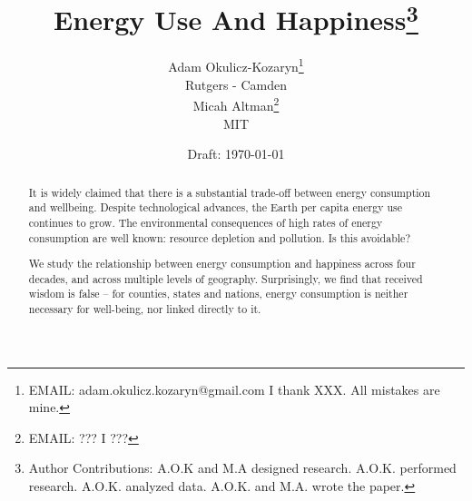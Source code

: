 \documentclass[10pt, letterpaper]{article}
\date{Draft: {}\today}
\title{
Energy Use And Happiness\footnote{Author Contributions: A.O.K and M.A designed
  research. A.O.K. performed research. A.O.K. analyzed data. A.O.K. and
  M.A. wrote the paper.  %
}
}
\author{
Adam Okulicz-Kozaryn\thanks{EMAIL: adam.okulicz.kozaryn@gmail.com
  \hfill I thank XXX.  All mistakes are mine.} \\
{\small Rutgers - Camden}\\
Micah Altman\thanks{EMAIL: ???
  \hfill I ???} \\
{\small MIT}
}
\begin{document}


\maketitle
\vspace{-.4in}
\begin{center}

\end{center}

\begin{abstract}
\noindent  

%

It is widely claimed that there is a substantial trade-off between energy consumption and wellbeing. 
Despite technological advances, the Earth per capita energy use continues to grow.
The environmental consequences of high rates of energy consumption are well known:
resource depletion and pollution. Is this avoidable?

We study the relationship between energy consumption and happiness across four decades, and across multiple levels of geography.  Surprisingly, we find that received wisdom is false -- for counties, states and nations, energy consumption is neither necessary for well-being, nor linked directly to it. 



\end{abstract}


\vspace{.15in} 
\end{document}
